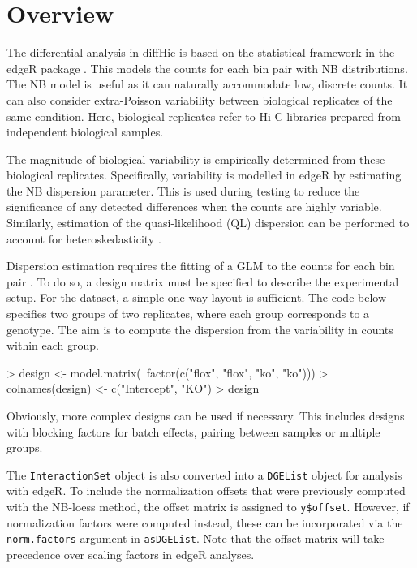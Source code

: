 \documentclass[12pt]{report}
\renewenvironment{Schunk}{\vspace{0pt}}{\vspace{0pt}}
\newcommand{\edgeR}{edgeR}
\newcommand{\pkgname}{diffHic}
\newcommand{\code}[1]{{\small\texttt{#1}}}
\begin{document}
\section{Overview}
The differential analysis in \pkgname{} is based on the statistical framework in the \edgeR{} package \citep{edgeR}.
This models the counts for each bin pair with NB distributions.
The NB model is useful as it can naturally accommodate low, discrete counts.
It can also consider extra-Poisson variability between biological replicates of the same condition.
Here, biological replicates refer to Hi-C libraries prepared from independent biological samples.

The magnitude of biological variability is empirically determined from these biological replicates.
Specifically, variability is modelled in \edgeR{} by estimating the NB dispersion parameter.
This is used during testing to reduce the significance of any detected differences when the counts are highly variable.
Similarly, estimation of the quasi-likelihood (QL) dispersion can be performed to account for heteroskedasticity \citep{lund2012ql}. 

Dispersion estimation requires the fitting of a GLM to the counts for each bin pair \citep{mccarthy2012glm}. 
To do so, a design matrix must be specified to describe the experimental setup.
For the \citeauthor{sofueva2013cohesin} dataset, a simple one-way layout is sufficient.
The code below specifies two groups of two replicates, where each group corresponds to a genotype.
The aim is to compute the dispersion from the variability in counts within each group.

\begin{Schunk}
\begin{Sinput}
> design <- model.matrix(~factor(c("flox", "flox", "ko", "ko")))
> colnames(design) <- c("Intercept", "KO")
> design
\end{Sinput}
\end{Schunk}

Obviously, more complex designs can be used if necessary.
This includes designs with blocking factors for batch effects, pairing between samples or multiple groups.

The \code{InteractionSet} object is also converted into a \code{DGEList} object for analysis with \edgeR{}.
To include the normalization offsets that were previously computed with the NB-loess method, the offset matrix is assigned to \code{y\$offset}.
However, if normalization factors were computed instead, these can be incorporated via the \code{norm.factors} argument in \code{asDGEList}.
Note that the offset matrix will take precedence over scaling factors in \edgeR{} analyses.
\end{document}
